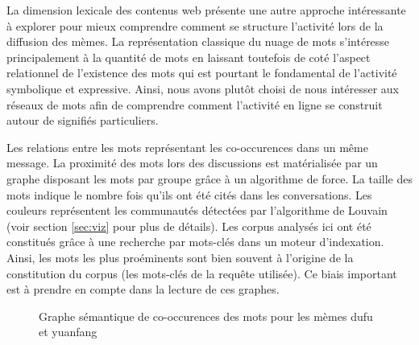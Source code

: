 La dimension lexicale des contenus web présente une autre approche intéressante \`a explorer pour mieux comprendre comment se structure l{\textquoteright}activité lors de la diffusion des mèmes. La représentation classique du nuage de mots s{\textquoteright}intéresse principalement \`a la quantité de mots en laissant toutefois de coté l{\textquoteright}aspect relationnel de l{\textquoteright}existence des mots qui est pourtant le fondamental de l{\textquoteright}activité symbolique et expressive. Ainsi, nous avons plut\^ot choisi de nous intéresser aux réseaux de mots afin de comprendre comment l{\textquoteright}activité en ligne se construit autour de signifiés particuliers. 

Les relations entre les mots représentant les co-occurences dans un même message. La proximité des mots lors des discussions est matérialisée par un graphe disposant les mots par groupe grâce à un algorithme de force. La taille des mots indique le nombre fois qu'ils ont été cités dans les conversations. Les couleurs représentent les communautés détectées par l'algorithme de Louvain \cite{Blondel2008} (voir section \ref{sec:viz} pour plus de détails). Les corpus analysés ici ont été constitués grâce \`a une recherche par mots-clés dans un moteur d{\textquoteright}indexation. Ainsi, les mots les plus proéminents sont bien souvent \`a l{\textquoteright}origine de la constitution du corpus (les mots-clés de la requête utilisée). Ce biais important est \`a prendre en compte dans la lecture de ces graphes.

\begin{figure}[h!]
    \centering
    
  \caption{
    Graphe sémantique de co-occurences des mots pour les mèmes dufu et yuanfang   
  }
\end{figure}

